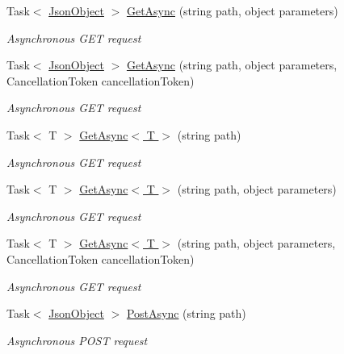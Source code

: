 \begin{DoxyCompactItemize}
Task$<$ \hyperlink{class_accela_1_1_windows_store_s_d_k_1_1_json_object}{Json\+Object} $>$ \hyperlink{class_accela_1_1_windows_store_s_d_k_1_1_accela_s_d_k_a6c4bac30ea2fcbdd36635901e1fe79ad}{Get\+Async} (string path, object parameters)
\begin{DoxyCompactList}\small\item\em Asynchronous G\+E\+T request \end{DoxyCompactList}\item 
Task$<$ \hyperlink{class_accela_1_1_windows_store_s_d_k_1_1_json_object}{Json\+Object} $>$ \hyperlink{class_accela_1_1_windows_store_s_d_k_1_1_accela_s_d_k_a684dc4f0a3f0e2b1c32fa6d6d408bd02}{Get\+Async} (string path, object parameters, Cancellation\+Token cancellation\+Token)
\begin{DoxyCompactList}\small\item\em Asynchronous G\+E\+T request \end{DoxyCompactList}\item 
Task$<$ T $>$ \hyperlink{class_accela_1_1_windows_store_s_d_k_1_1_accela_s_d_k_ad7990bc418c4ef75faee754b1c370738}{Get\+Async$<$ T $>$} (string path)
\begin{DoxyCompactList}\small\item\em Asynchronous G\+E\+T request \end{DoxyCompactList}\item 
Task$<$ T $>$ \hyperlink{class_accela_1_1_windows_store_s_d_k_1_1_accela_s_d_k_a16eea62a6d665b0b1a160e3f96581418}{Get\+Async$<$ T $>$} (string path, object parameters)
\begin{DoxyCompactList}\small\item\em Asynchronous G\+E\+T request \end{DoxyCompactList}\item 
Task$<$ T $>$ \hyperlink{class_accela_1_1_windows_store_s_d_k_1_1_accela_s_d_k_af043658055c20c043beb37acd9b47c6a}{Get\+Async$<$ T $>$} (string path, object parameters, Cancellation\+Token cancellation\+Token)
\begin{DoxyCompactList}\small\item\em Asynchronous G\+E\+T request \end{DoxyCompactList}\item 
Task$<$ \hyperlink{class_accela_1_1_windows_store_s_d_k_1_1_json_object}{Json\+Object} $>$ \hyperlink{class_accela_1_1_windows_store_s_d_k_1_1_accela_s_d_k_a1bf4e2d60bfcf4e046d3418e3b027ca7}{Post\+Async} (string path)
\begin{DoxyCompactList}\small\item\em Asynchronous P\+O\+S\+T request \end{DoxyCompactList}\item 

\end{DoxyCompactItemize}
